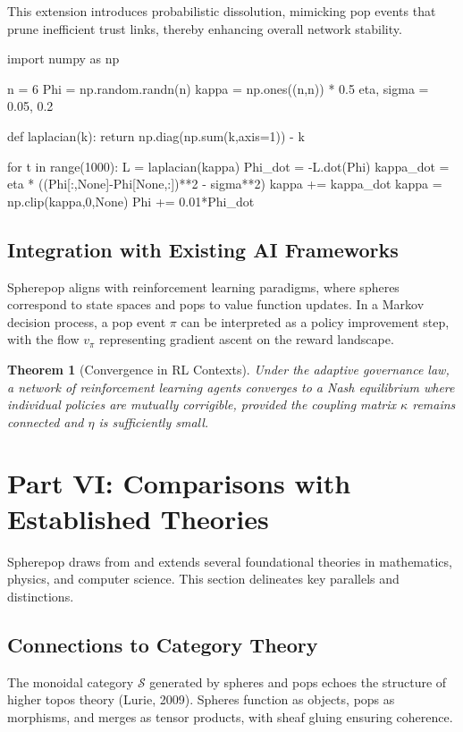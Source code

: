 \documentclass[12pt]{article}
\newtheorem{theorem}{Theorem}
\begin{document}
This extension introduces probabilistic dissolution, mimicking pop events that prune inefficient trust links, thereby enhancing overall network stability.

\begin{codeblock}
import numpy as np

n = 6
Phi = np.random.randn(n)
kappa = np.ones((n,n)) * 0.5
eta, sigma = 0.05, 0.2

def laplacian(k):
    return np.diag(np.sum(k,axis=1)) - k

for t in range(1000):
    L = laplacian(kappa)
    Phi_dot = -L.dot(Phi)
    kappa_dot = eta * ((Phi[:,None]-Phi[None,:])**2 - sigma**2)
    kappa += kappa_dot
    kappa = np.clip(kappa,0,None)
    Phi += 0.01*Phi_dot
\end{codeblock}

\subsection{Integration with Existing AI Frameworks}
Spherepop aligns with reinforcement learning paradigms, where spheres correspond to state spaces and pops to value function updates. In a Markov decision process, a pop event \(\pi\) can be interpreted as a policy improvement step, with the flow \(v_\pi\) representing gradient ascent on the reward landscape.

\begin{theorem}[Convergence in RL Contexts]
Under the adaptive governance law, a network of reinforcement learning agents converges to a Nash equilibrium where individual policies are mutually corrigible, provided the coupling matrix \(\kappa\) remains connected and \(\eta\) is sufficiently small.
\end{theorem}

\section*{Part VI: Comparisons with Established Theories}

Spherepop draws from and extends several foundational theories in mathematics, physics, and computer science. This section delineates key parallels and distinctions.

\subsection{Connections to Category Theory}
The monoidal category \(\mathcal{S}\) generated by spheres and pops echoes the structure of higher topos theory (Lurie, 2009). Spheres function as objects, pops as morphisms, and merges as tensor products, with sheaf gluing ensuring coherence.
\end{document}
